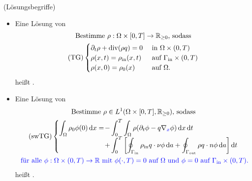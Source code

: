 \begin{define}(Lösungsbegriffe)
	
	\begin{itemize}
		\item Eine Lösung von
		\begin{gather*}
		\text{Bestimme } \rho: \Omega \times [0,T] \to \mathbb{R}_{\geq 0} \text{, sodass}\\
		\operatorname{(TG)}
		\begin{cases}
		\partial_t \rho + \operatorname{div}(\rho q) = 0 &\text{ in } \Omega \times (0,T)\\
		\rho(x,t) = \rho_{\text{in}}(x,t) &\text{ auf } \Gamma_{{\text{in}}} \times (0,T)\\
		\rho(x,0) = \rho_0(x) &\text{ auf } \Omega.
		\end{cases}
		\end{gather*}
		heißt .
		\item Eine Lösung von 
		\begin{gather*} 
		\text{Bestimme } \rho \in L^1(\Omega \times [0,T], \R_{\geq 0}) \text{, sodass}\\
		\swlTG
		\begin{cases}
		\displaystyle
		\int_{\Omega} \rho_0 \phi(0) \diff x = \mkern-16mu &- \displaystyle \int_{0}^{T} \int_{\Omega} \rho (\partial_t \phi - q \nabla_{\unklar{x}} \phi ) \diff x \diff t \\
		&+\displaystyle\int_{0}^{T} \left[ \oint_{\Gammain} \rhoin q \cdot \nu \phi \diff a + \oint_{\Gammaout} \rho q \cdot n \phi \diff a \right] \diff t
		\end{cases}	\\
		\unklar{\text{ für alle } \phi: \Omega \times (0,T) \to \R \text{ mit } \phi(\cdot,T) = 0 \text{ auf } \Omega \text{ und } \phi = 0 \text{ auf } \Gammain \times (0,T).}
		\end{gather*}
		heißt .
	\end{itemize}
\end{define}


